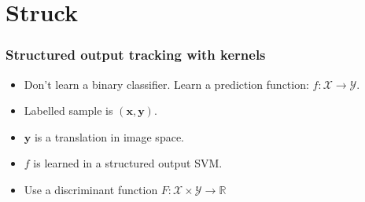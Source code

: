 \section{Struck}

\begin{frame}
    \frametitle{Structured output tracking with kernels \cite{6126251}}
    \begin{itemize}
        \item Don't learn a binary classifier. Learn a prediction function: \(f : \mathcal{X} \rightarrow \mathcal{Y}\).
        \item Labelled sample is \((\mathbf{x}, \mathbf{y})\).
        \item \(\mathbf{y}\) is a translation in image space.
        \item \(f\) is learned in a structured output SVM.
        \item Use a discriminant function \(F : \mathcal{X} \times \mathcal{Y} \to \mathbb{R}\)
            \struckDiscriminant

    \end{itemize}
\end{frame}

